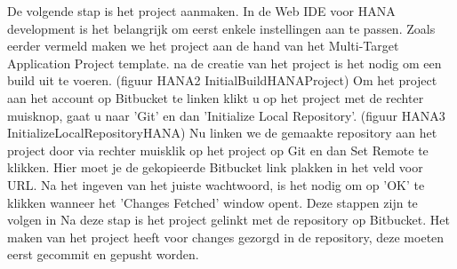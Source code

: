             De volgende stap is het project aanmaken. In de Web IDE voor HANA development is het belangrijk om eerst enkele instellingen aan te passen.
            Zoals eerder vermeld maken we het project aan de hand van het Multi-Target Application Project template. na de creatie van het project is het nodig om een build uit te voeren. (figuur HANA2 InitialBuildHANAProject)
            Om het project aan het account op Bitbucket te linken klikt u op het project met de rechter muisknop, gaat u naar 'Git' en dan 'Initialize Local Repository'. (figuur HANA3 InitializeLocalRepositoryHANA)
            Nu linken we de gemaakte repository aan het project door via rechter muisklik op het project op Git en dan Set Remote te klikken. Hier moet je de gekopieerde Bitbucket link plakken in het veld voor URL. Na het ingeven van het juiste wachtwoord, is het nodig om op 'OK' te klikken wanneer het 'Changes Fetched' window opent. Deze stappen zijn te volgen in %
            Na deze stap is het project gelinkt met de repository op Bitbucket. Het maken van het project heeft voor changes gezorgd in de repository, deze moeten eerst gecommit en gepusht worden. %
    
